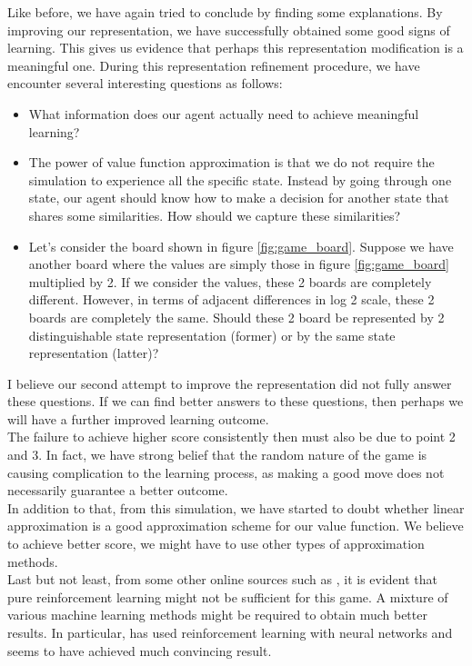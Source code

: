 Like before, we have again tried to conclude by finding some explanations. By improving our representation, we have successfully obtained some good signs of learning. This gives us evidence that perhaps this representation modification is a meaningful one. During this representation refinement procedure, we have encounter several interesting questions as follows:
\begin{itemize}
	\item What information does our agent actually need to achieve meaningful learning?
	\item The power of value function approximation is that we do not require the simulation to experience all the specific state. Instead by going through one state, our agent should know how to make a decision for another state that shares some similarities. How should we capture these similarities?
	\item Let's consider the board shown in figure \ref{fig:game_board}. Suppose we have another board where the values are simply those in figure \ref{fig:game_board} multiplied by 2. If we consider the values, these 2 boards are completely different. However, in terms of adjacent differences in log 2 scale, these 2 boards are completely the same. Should these 2 board be represented by 2 distinguishable state representation (former) or by the same state representation (latter)?
\end{itemize}
I believe our second attempt to improve the representation did not fully answer these questions. If we can find better answers to these questions, then perhaps we will have a further improved learning outcome.
\\ 

The failure to achieve higher score consistently then must also be due to point 2 and 3. In fact, we have strong belief that the random nature of the game is causing complication to the learning process, as making a good move does not necessarily guarantee a better outcome.
\\

In addition to that, from this simulation, we have started to doubt whether linear approximation is a good approximation scheme for our value function. We believe to achieve better score, we might have to use other types of approximation methods.
\\

Last but not least, from some other online sources such as \cite{dedieu2017deep}, it is evident that pure reinforcement learning might not be sufficient for this game. A mixture of various machine learning methods might be required to obtain much better results. In particular, \cite{dedieu2017deep} has used reinforcement learning with neural networks and seems to have achieved much convincing result.
\\

